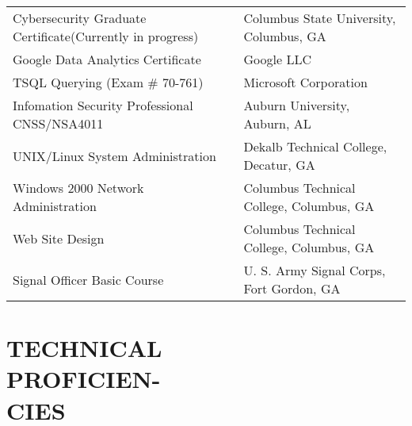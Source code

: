 \documentclass[margin, 10pt]{res} %
\begin{document}
\begin{resume}
\small
    \begin{tabular}{l l }
        Cybersecurity Graduate Certificate\tiny (Currently in progress) & Columbus State University, Columbus, GA \\
        Google Data Analytics Certificate & Google LLC\\
        TSQL Querying (Exam \# 70-761) & Microsoft Corporation\\
        Infomation Security Professional CNSS/NSA4011  & Auburn University, Auburn, AL\\
        UNIX/Linux System Administration  & Dekalb Technical College,  Decatur, GA\\
        Windows 2000 Network Administration  & Columbus Technical College, Columbus, GA\\
        Web Site Design  & Columbus Technical College, Columbus, GA\\
        Signal Officer Basic Course  & U. S. Army Signal Corps,  Fort Gordon, GA\\
    \end{tabular}
    \normalsize
%
%
%
%
%
%


\section{TECHNICAL\\ PROFICIEN-\\ CIES}


\end{resume}
\end{document}
